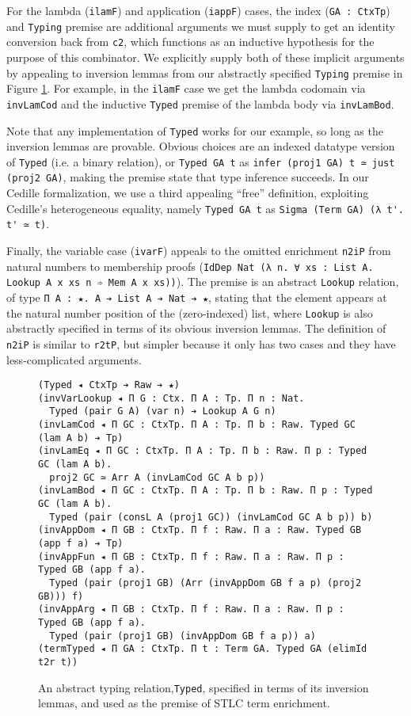 \documentclass[acmsmall]{acmart}\settopmatter{}
\newcommand{\reffig}[1]{Figure \ref{fig:#1}}
\newcommand{\labfig}[1]{\label{fig:#1}}
\begin{document}
For the lambda (\verb;ilamF;) and application (\verb;iappF;) cases,
the index (\verb;GA : CtxTp;) and \verb;Typing; premise are additional
arguments we must supply to get an identity conversion back from
\verb;c2;, which functions as an inductive hypothesis for the
purpose of this combinator. We explicitly supply both of these
implicit arguments by appealing to inversion lemmas from our
abstractly specified \verb;Typing; premise in \reffig{inv}. For
example, in the \verb;ilamF; case we get the lambda codomain via
\verb;invLamCod; and the inductive \verb;Typed; premise of the lambda
body via \verb;invLamBod;.

Note that any implementation of \verb;Typed; works for our example,
so long as the inversion lemmas are provable. Obvious choices are an
indexed datatype version of \verb;Typed; (i.e. a binary relation), or
\verb;Typed GA t; as \verb;infer (proj1 GA) t ≃ just (proj2 GA);,
making the premise state that type inference succeeds. In our
Cedille formalization, we use a third appealing ``free'' definition,
exploiting Cedille's heterogeneous equality, namely
\verb;Typed GA t; as \verb;Sigma (Term GA) (λ t'. t' ≃ t);.

Finally, the variable case (\verb;ivarF;) appeals to the omitted
enrichment \verb;n2iP; from natural numbers to membership proofs
(\verb;IdDep Nat (λ n. ∀ xs : List A. Lookup A x xs n ➾ Mem A x xs));).
The premise is an abstract \verb;Lookup; relation, of type
\verb;Π A : ★. A ➔ List A ➔ Nat ➔ ★;, stating that the element appears
at the natural number position of the (zero-indexed) list, where
\verb;Lookup; is also abstractly specified in terms of its obvious
inversion lemmas. The definition of \verb;n2iP; is similar to
\verb;r2tP;, but simpler because it only has two cases and they have
less-complicated arguments.



\begin{figure}
\centering

\begin{verbatim}
(Typed ◂ CtxTp ➔ Raw ➔ ★)
(invVarLookup ◂ Π G : Ctx. Π A : Tp. Π n : Nat. 
  Typed (pair G A) (var n) ➔ Lookup A G n)
(invLamCod ◂ Π GC : CtxTp. Π A : Tp. Π b : Raw. Typed GC (lam A b) ➔ Tp)
(invLamEq ◂ Π GC : CtxTp. Π A : Tp. Π b : Raw. Π p : Typed GC (lam A b).
  proj2 GC ≃ Arr A (invLamCod GC A b p))
(invLamBod ◂ Π GC : CtxTp. Π A : Tp. Π b : Raw. Π p : Typed GC (lam A b).
  Typed (pair (consL A (proj1 GC)) (invLamCod GC A b p)) b)
(invAppDom ◂ Π GB : CtxTp. Π f : Raw. Π a : Raw. Typed GB (app f a) ➔ Tp)
(invAppFun ◂ Π GB : CtxTp. Π f : Raw. Π a : Raw. Π p : Typed GB (app f a).
  Typed (pair (proj1 GB) (Arr (invAppDom GB f a p) (proj2 GB))) f)
(invAppArg ◂ Π GB : CtxTp. Π f : Raw. Π a : Raw. Π p : Typed GB (app f a).
  Typed (pair (proj1 GB) (invAppDom GB f a p)) a)
(termTyped ◂ Π GA : CtxTp. Π t : Term GA. Typed GA (elimId t2r t))
\end{verbatim}

\caption{An abstract typing relation,\texttt{Typed}, specified
  in terms of its inversion lemmas, and used as the premise of STLC term enrichment.}
\labfig{inv}
\end{figure}
\end{document}
